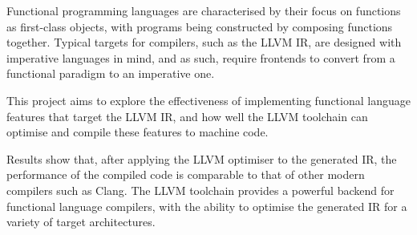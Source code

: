 Functional programming languages are characterised by their focus on functions as first-class
objects, with programs being constructed by composing functions together. Typical targets for
compilers, such as the LLVM IR, are designed with imperative languages in mind, and as such, require
frontends to convert from a functional paradigm to an imperative one.

This project aims to explore the effectiveness of implementing functional language features that
target the LLVM IR, and how well the LLVM toolchain can optimise and compile these features to
machine code.

Results show that, after applying the LLVM optimiser to the generated IR, the performance of the
compiled code is comparable to that of other modern compilers such as Clang. The LLVM toolchain
provides a powerful backend for functional language compilers, with the ability to optimise the
generated IR for a variety of target architectures.
